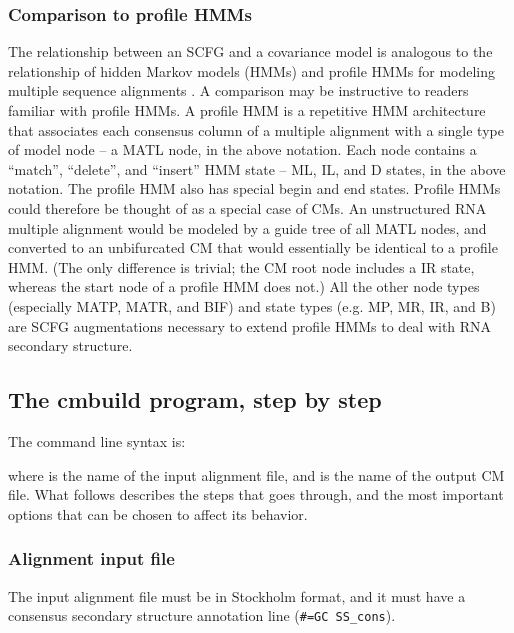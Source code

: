 \subsubsection{Comparison to profile HMMs}

The relationship between an SCFG and a covariance model is analogous
to the relationship of hidden Markov models (HMMs) and profile HMMs
for modeling multiple sequence alignments
\cite{Krogh94,Durbin98,Eddy98}. A comparison may be instructive to
readers familiar with profile HMMs.  A profile HMM is a repetitive HMM
architecture that associates each consensus column of a multiple
alignment with a single type of model node -- a MATL node, in the
above notation. Each node contains a ``match'', ``delete'', and
``insert'' HMM state -- ML, IL, and D states, in the above notation.
The profile HMM also has special begin and end states. Profile HMMs
could therefore be thought of as a special case of CMs. An
unstructured RNA multiple alignment would be modeled by a guide tree
of all MATL nodes, and converted to an unbifurcated CM that would
essentially be identical to a profile HMM. (The only difference is
trivial; the CM root node includes a IR state, whereas the start node
of a profile HMM does not.) All the other node types (especially MATP,
MATR, and BIF) and state types (e.g. MP, MR, IR, and B) are SCFG
augmentations necessary to extend profile HMMs to deal with RNA
secondary structure.


\subsection{The cmbuild program, step by step}

The  command line syntax is:


where \prog{[alifile]} is the name of the input alignment file, and
\prog{[cmfile]} is the name of the output CM file. What follows
describes the steps that  goes through, and the most
important options that can be chosen to affect its behavior.

\subsubsection{Alignment input file}

The input alignment file must be in Stockholm format, and it must have
a consensus secondary structure annotation line (\verb+#=GC SS_cons+).

